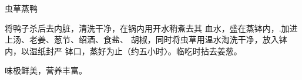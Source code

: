 \begin{recipe}{虫草蒸鸭}

\ingredients




\cooking

将鸭子杀后去内脏，清洗干净，在锅内用开水稍煮去其 血水，盛在蒸钵内，.加进上汤、老姜、葱节、绍酒、食盐、 胡椒，同时将虫草用温水淘洗干净，放入钵内，以湿纸封严 钵口，蒸好为止（约五小时〉。临吃时拈去姜葱。

\notes

味极鲜美，营养丰富。

\end{recipe}

